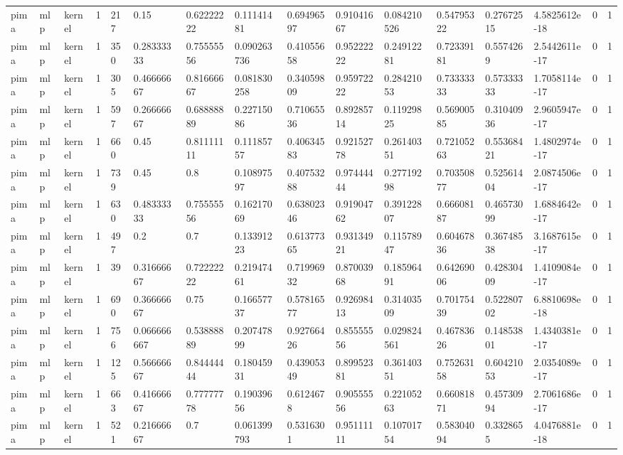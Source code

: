 \begin{tabular}{llllllllllllllll}
pima & mlp & kernel & 1 & 217 & 0.15 & 0.62222222 & 0.11141481 & 0.69496597 & 0.91041667 & 0.084210526 & 0.54795322 & 0.27672515 & 4.5825612e-18 & 0 & 1 \\
pima & mlp & kernel & 1 & 350 & 0.28333333 & 0.75555556 & 0.090263736 & 0.41055658 & 0.95222222 & 0.24912281 & 0.72339181 & 0.5574269 & 2.5442611e-17 & 0 & 1 \\
pima & mlp & kernel & 1 & 305 & 0.46666667 & 0.81666667 & 0.081830258 & 0.34059809 & 0.95972222 & 0.28421053 & 0.73333333 & 0.57333333 & 1.7058114e-17 & 0 & 1 \\
pima & mlp & kernel & 1 & 597 & 0.26666667 & 0.68888889 & 0.22715086 & 0.71065536 & 0.89285714 & 0.11929825 & 0.56900585 & 0.31040936 & 2.9605947e-17 & 0 & 1 \\
pima & mlp & kernel & 1 & 660 & 0.45 & 0.81111111 & 0.11185757 & 0.40634583 & 0.92152778 & 0.26140351 & 0.72105263 & 0.55368421 & 1.4802974e-17 & 0 & 1 \\
pima & mlp & kernel & 1 & 739 & 0.45 & 0.8 & 0.10897597 & 0.40753288 & 0.97444444 & 0.27719298 & 0.70350877 & 0.52561404 & 2.0874506e-17 & 0 & 1 \\
pima & mlp & kernel & 1 & 630 & 0.48333333 & 0.75555556 & 0.16217069 & 0.63802346 & 0.91904762 & 0.39122807 & 0.66608187 & 0.46573099 & 1.6884642e-17 & 0 & 1 \\
pima & mlp & kernel & 1 & 497 & 0.2 & 0.7 & 0.13391223 & 0.61377365 & 0.93134921 & 0.11578947 & 0.60467836 & 0.36748538 & 3.1687615e-17 & 0 & 1 \\
pima & mlp & kernel & 1 & 39 & 0.31666667 & 0.72222222 & 0.21947461 & 0.71996932 & 0.87003968 & 0.18596491 & 0.64269006 & 0.42830409 & 1.4109084e-17 & 0 & 1 \\
pima & mlp & kernel & 1 & 690 & 0.36666667 & 0.75 & 0.16657737 & 0.57816577 & 0.92698413 & 0.31403509 & 0.70175439 & 0.52280702 & 6.8810698e-18 & 0 & 1 \\
pima & mlp & kernel & 1 & 756 & 0.066666667 & 0.53888889 & 0.20747899 & 0.92766426 & 0.85555556 & 0.029824561 & 0.46783626 & 0.14853801 & 1.4340381e-17 & 0 & 1 \\
pima & mlp & kernel & 1 & 125 & 0.56666667 & 0.84444444 & 0.18045931 & 0.43905349 & 0.89952381 & 0.36140351 & 0.75263158 & 0.60421053 & 2.0354089e-17 & 0 & 1 \\
pima & mlp & kernel & 1 & 663 & 0.41666667 & 0.77777778 & 0.19039656 & 0.6124678 & 0.90555556 & 0.22105263 & 0.66081871 & 0.45730994 & 2.7061686e-17 & 0 & 1 \\
pima & mlp & kernel & 1 & 521 & 0.21666667 & 0.7 & 0.061399793 & 0.5316301 & 0.95111111 & 0.10701754 & 0.58304094 & 0.3328655 & 4.0476881e-18 & 0 & 1 \\

\end{tabular}
